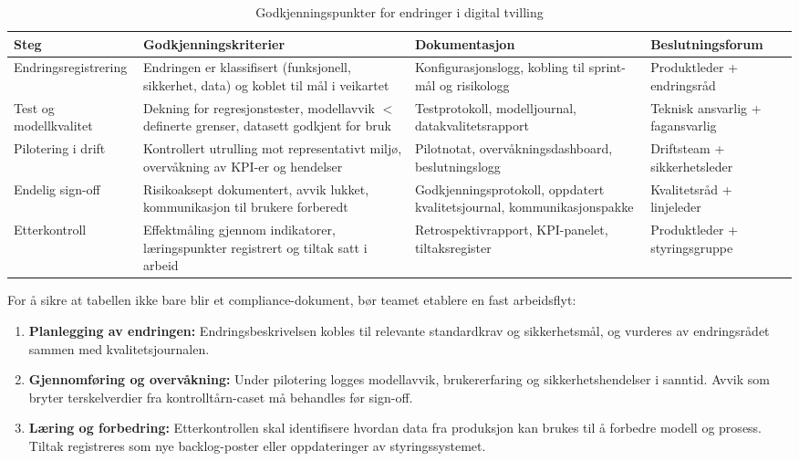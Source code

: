 \begin{table}[ht]
    \centering
    \caption{Godkjenningspunkter for endringer i digital tvilling}
    \label{tab:driftsgodkjenning}
    \begin{tabular}{|p{3.0cm}|p{4.8cm}|p{4.8cm}|p{3.0cm}|}
        \hline
        \textbf{Steg} & \textbf{Godkjenningskriterier} & \textbf{Dokumentasjon} & \textbf{Beslutningsforum} \\
        \hline
        Endringsregistrering & Endringen er klassifisert (funksjonell, sikkerhet, data) og koblet til mål i veikartet & Konfigurasjonslogg, kobling til sprint-mål og risikologg & Produktleder + endringsråd \\
        \hline
        Test og modellkvalitet & Dekning for regresjonstester, modellavvik \(<\) definerte grenser, datasett godkjent for bruk & Testprotokoll, modelljournal, datakvalitetsrapport & Teknisk ansvarlig + fagansvarlig \\
        \hline
        Pilotering i drift & Kontrollert utrulling mot representativt miljø, overvåkning av KPI-er og hendelser & Pilotnotat, overvåkningsdashboard, beslutningslogg & Driftsteam + sikkerhetsleder \\
        \hline
        Endelig sign-off & Risikoaksept dokumentert, avvik lukket, kommunikasjon til brukere forberedt & Godkjenningsprotokoll, oppdatert kvalitetsjournal, kommunikasjonspakke & Kvalitetsråd + linjeleder \\
        \hline
        Etterkontroll & Effektmåling gjennom indikatorer, læringspunkter registrert og tiltak satt i arbeid & Retrospektivrapport, KPI-panelet, tiltaksregister & Produktleder + styringsgruppe \\
        \hline
    \end{tabular}
\end{table}

For å sikre at tabellen ikke bare blir et compliance-dokument, bør teamet etablere en fast arbeidsflyt:
\begin{enumerate}
    \item \textbf{Planlegging av endringen:} Endringsbeskrivelsen kobles til relevante standardkrav og sikkerhetsmål, og vurderes av endringsrådet sammen med kvalitetsjournalen.
    \item \textbf{Gjennomføring og overvåkning:} Under pilotering logges modellavvik, brukererfaring og sikkerhetshendelser i sanntid. Avvik som bryter terskelverdier fra kontrolltårn-caset må behandles før sign-off.
    \item \textbf{Læring og forbedring:} Etterkontrollen skal identifisere hvordan data fra produksjon kan brukes til å forbedre modell og prosess. Tiltak registreres som nye backlog-poster eller oppdateringer av styringssystemet.
\end{enumerate}



